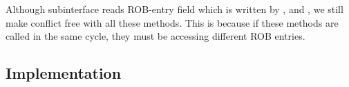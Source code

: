 Although subinterface  reads ROB-entry field  which is written by ,  and , we still make  conflict free with all these methods.
This is because if these methods are called in the same cycle, they must be accessing different ROB entries.

\subsection{Implementation}